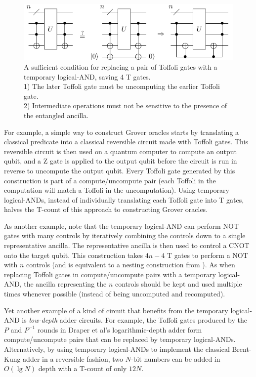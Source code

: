 \documentclass[twocolumn]{quantumarticle-customized}
\begin{document}
\begin{figure}
  \includegraphics[width=\linewidth]{paired-toffoli-replacement-rule.pdf}
  \caption{
	A sufficient condition for replacing a pair of Toffoli gates with a temporary logical-AND, saving 4 T gates.\\
	1) The later Toffoli gate must be uncomputing the earlier Toffoli gate.\\
	2) Intermediate operations must not be sensitive to the presence of the entangled ancilla.
  }
  \label{fig:paired-toffoli-replacement-rule}
\end{figure}

For example, a simple way to construct Grover oracles starts by translating a classical predicate into a classical reversible circuit made with Toffoli gates.
This reversible circuit is then used on a quantum computer to compute an output qubit, and a Z gate is applied to the output qubit before the circuit is run in reverse to uncompute the output qubit.
Every Toffoli gate generated by this construction is part of a compute/uncompute pair (each Toffoli in the computation will match a Toffoli in the uncomputation).
Using temporary logical-ANDs, instead of individually translating each Toffoli gate into T gates, halves the T-count of this approach to constructing Grover oracles.

As another example, note that the temporary logical-AND can perform NOT gates with many controls by iteratively combining the controls down to a single representative ancilla.
The representative ancilla is then used to control a CNOT onto the target qubit.
This construction takes $4n-4$ T gates to perform a NOT with $n$ controls (and is equivalent to a nesting construction from \cite{Jones2013}).
As when replacing Toffoli gates in compute/uncompute pairs with a temporary logical-AND, the ancilla representing the $n$ controls should be kept and used multiple times whenever possible (instead of being uncomputed and recomputed).

Yet another example of a kind of circuit that benefits from the temporary logical-AND is {\em low-depth} adder circuits.
For example, the Toffoli gates produced by the $P$ and $P^{-1}$ rounds in Draper et al's logarithmic-depth adder \cite{Draper2004} form compute/uncompute pairs that can be replaced by temporary logical-ANDs.
Alternatively, by using temporary logical-ANDs to implement the classical Brent-Kung adder \cite{brent1982} in a reversible fashion, two $N$-bit numbers can be added in $O(\lg N)$ depth with a T-count of only $12N$.
\end{document}
